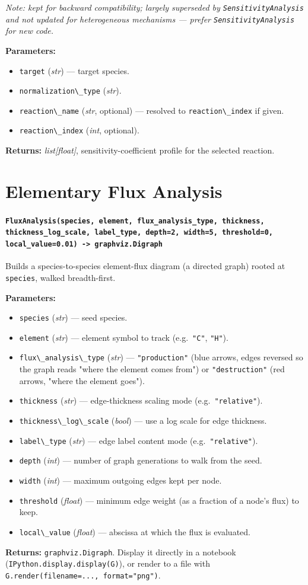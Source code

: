 \documentclass[11pt,a4paper]{report}
\newcommand{\pymethod}[1]{\subsubsection{\texttt{#1}}}
\newcommand{\returns}{\vspace{2mm}\noindent\textbf{Returns:} }
\newenvironment{params}{\vspace{1mm}\noindent\textbf{Parameters:}\begin{itemize}[leftmargin=1.1cm,label={--},itemsep=1pt,topsep=2pt]}{\end{itemize}}
\newcommand{\pkg}[1]{\lstinline|#1|}
\begin{document}
\vspace{-1mm}
\textit{Note: kept for backward compatibility; largely superseded by
\pkg{SensitivityAnalysis} and not updated for heterogeneous mechanisms ---
prefer \pkg{SensitivityAnalysis} for new code.}

\begin{params}
\item \pkg{target} (\textit{str}) --- target species.
\item \pkg{normalization\_type} (\textit{str}).
\item \pkg{reaction\_name} (\textit{str}, optional) --- resolved to
  \pkg{reaction\_index} if given.
\item \pkg{reaction\_index} (\textit{int}, optional).
\end{params}
\returns \textit{list[float]}, sensitivity-coefficient profile for the
selected reaction.

\chapter{Elementary Flux Analysis}

\pymethod{FluxAnalysis(species, element, flux\_analysis\_type, thickness, thickness\_log\_scale, label\_type, depth=2, width=5, threshold=0, local\_value=0.01) -> graphviz.Digraph}

Builds a species-to-species element-flux diagram (a directed graph) rooted
at \pkg{species}, walked breadth-first.

\begin{params}
\item \pkg{species} (\textit{str}) --- seed species.
\item \pkg{element} (\textit{str}) --- element symbol to track (e.g.\
  \pkg{"C"}, \pkg{"H"}).
\item \pkg{flux\_analysis\_type} (\textit{str}) --- \pkg{"production"} (blue
  arrows, edges reversed so the graph reads "where the element comes from")
  or \pkg{"destruction"} (red arrows, "where the element goes").
\item \pkg{thickness} (\textit{str}) --- edge-thickness scaling mode (e.g.\
  \pkg{"relative"}).
\item \pkg{thickness\_log\_scale} (\textit{bool}) --- use a log scale for
  edge thickness.
\item \pkg{label\_type} (\textit{str}) --- edge label content mode (e.g.\
  \pkg{"relative"}).
\item \pkg{depth} (\textit{int}) --- number of graph generations to walk
  from the seed.
\item \pkg{width} (\textit{int}) --- maximum outgoing edges kept per node.
\item \pkg{threshold} (\textit{float}) --- minimum edge weight (as a
  fraction of a node's flux) to keep.
\item \pkg{local\_value} (\textit{float}) --- abscissa at which the flux is
  evaluated.
\end{params}
\returns \pkg{graphviz.Digraph}. Display it directly in a notebook
(\pkg{IPython.display.display(G)}), or render to a file with
\pkg{G.render(filename=..., format="png")}.
\end{document}

